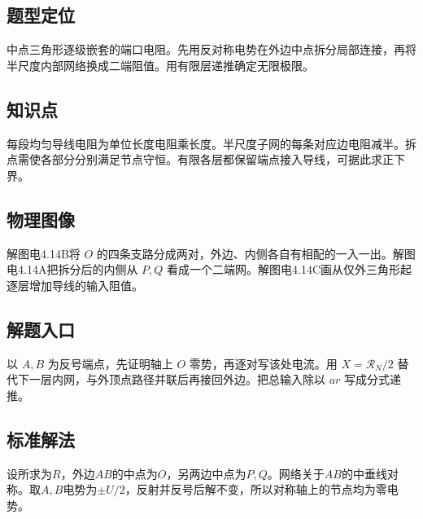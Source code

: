 \documentclass[UTF8,fontset=fandol,a4paper,11pt]{ctexart}
\begin{document}


\subsection*{题型定位}

中点三角形逐级嵌套的端口电阻。先用反对称电势在外边中点拆分局部连接，再将半尺度内部网络换成二端阻值。用有限层递推确定无限极限。



\subsection*{知识点}

每段均匀导线电阻为单位长度电阻乘长度。半尺度子网的每条对应边电阻减半。拆点需使各部分分别满足节点守恒。有限各层都保留端点接入导线，可据此求正下界。



\subsection*{物理图像}

解图电4.14B将 $O$ 的四条支路分成两对，外边、内侧各自有相配的一入一出。解图电4.14A把拆分后的内侧从 $P,Q$ 看成一个二端网。解图电4.14C画从仅外三角形起逐层增加导线的输入阻值。



\subsection*{解题入口}

以 $A,B$ 为反号端点，先证明轴上 $O$ 零势，再逐对写该处电流。用 $X=\mathcal R_N/2$ 替代下一层内网，与外顶点路径并联后再接回外边。把总输入除以 $ar$ 写成分式递推。


\subsection*{标准解法}

设所求为$R$，外边$AB$的中点为$O$，另两边中点为$P,Q$。网络关于$AB$的中垂线对称。取$A,B$电势为$\pm U/2$，反射并反号后解不变，所以对称轴上的节点均为零电势。
\end{document}
